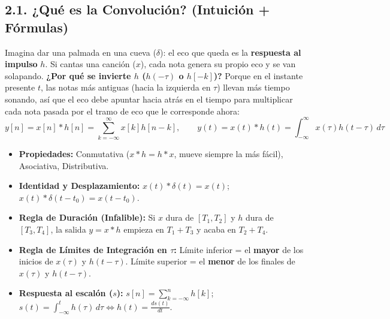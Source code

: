 \documentclass[10pt,a4paper]{article}
\begin{document}
	\subsection*{2.1. ¿Qué es la Convolución? (Intuición + Fórmulas)}
	Imagina dar una palmada en una cueva ($\delta$): el eco que queda es la \textbf{respuesta al impulso} $h$. Si cantas una canción ($x$), cada nota genera su propio eco y se van solapando. \textbf{¿Por qué se invierte $h$ ($h(-\tau)$ o $h[-k]$)?} Porque en el instante presente $t$, las notas más antiguas (hacia la izquierda en $\tau$) llevan más tiempo sonando, así que el eco debe apuntar hacia atrás en el tiempo para multiplicar cada nota pasada por el tramo de eco que le corresponde ahora:
	$$y[n] = x[n] * h[n] = \sum_{k=-\infty}^{\infty} x[k]h[n-k], \qquad y(t) = x(t) * h(t) = \int_{-\infty}^{\infty} x(\tau)h(t-\tau)\,d\tau$$
	\begin{itemize}
		\item \textbf{Propiedades:} Conmutativa ($x*h = h*x$, mueve siempre la más fácil), Asociativa, Distributiva.
		\item \textbf{Identidad y Desplazamiento:} $x(t) * \delta(t) = x(t)$; \quad $x(t) * \delta(t - t_0) = x(t - t_0)$.
		\item \textbf{Regla de Duración (Infalible):} Si $x$ dura de $[T_1, T_2]$ y $h$ dura de $[T_3, T_4]$, la salida $y = x * h$ empieza en \textbf{$T_1 + T_3$} y acaba en \textbf{$T_2 + T_4$}.
		\item \textbf{Regla de Límites de Integración en $\tau$:} Límite inferior = el \textbf{mayor} de los inicios de $x(\tau)$ y $h(t-\tau)$. Límite superior = el \textbf{menor} de los finales de $x(\tau)$ y $h(t-\tau)$.
		\item \textbf{Respuesta al escalón ($s$):} $s[n] = \sum_{k=-\infty}^{n} h[k]$; \quad $s(t) = \int_{-\infty}^{t} h(\tau)\,d\tau \iff h(t) = \frac{ds(t)}{dt}$.
	\end{itemize}
	
\end{document}
